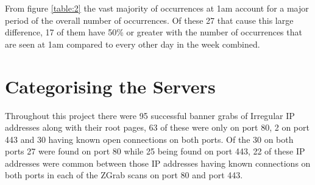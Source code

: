 \documentclass[a4wide,leqno,12pt]{report}
\begin{document}
From figure \ref{table:2} the vast majority of occurrences at 1am account for a major period of the overall number of occurrences. Of these 27 that cause this large difference, 17 of them have 50\% or greater with the number of occurrences that are seen at 1am compared to every other day in the week combined.
\section{Categorising the Servers}
\begin{table}[H]
\centering
{}
\caption{Categorises of Irregular IP addresses}
\label{table:category}
\end{table}

Throughout this project there were 95 successful banner grabs of Irregular IP addresses along with their root pages, 63 of these were only on port 80, 2 on port 443 and 30 having known open connections on both ports. Of the 30 on both ports 27 were found on port 80 while 25 being found on port 443, 22 of these IP addresses were common between those IP addresses having known connections on both ports in each of the ZGrab scans on port 80 and port 443.\\
\end{document}
